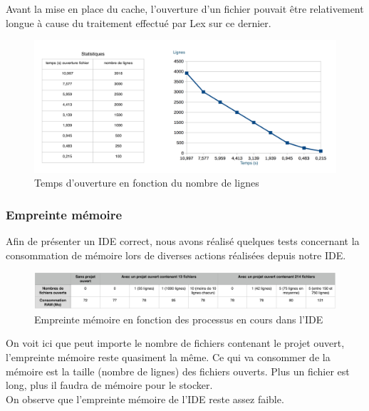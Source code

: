 \documentclass[a4paper,12pt]{article}
\begin{document}
		Avant la mise en place du cache, l'ouverture d'un fichier pouvait être relativement longue à cause du traitement effectué par Lex sur ce dernier.
		
		\newpage
		
		\begin{figure}[h!]
				\begin{center}
					\includegraphics[scale=0.5]{images/stats_ouverture}
					\caption{Temps d'ouverture en fonction du nombre de lignes}
				\end{center}
		\end{figure}
		
		\subsubsection{Empreinte mémoire}
		
		Afin de présenter un IDE correct, nous avons réalisé quelques tests concernant la consommation de mémoire lors de diverses actions réalisées depuis notre IDE.
		
		\begin{figure}[h!]
				\begin{center}
					\includegraphics[scale=0.45]{images/mem}
					\caption{Empreinte mémoire en fonction des processus en cours dans l'IDE}
				\end{center}
		\end{figure}
		
		On voit ici que peut importe le nombre de fichiers contenant le projet ouvert, l'empreinte mémoire reste quasiment la même. Ce qui va consommer de la mémoire est la taille (nombre de lignes) des fichiers ouverts. Plus un fichier est long, plus il faudra de mémoire pour le stocker. \\
		On observe que l'empreinte mémoire de l'IDE reste assez faible.
\end{document}
